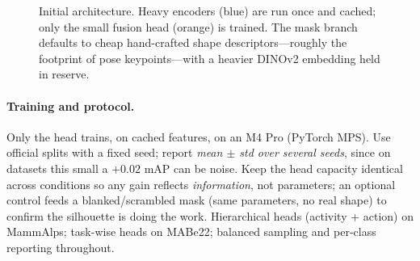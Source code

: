 \documentclass[11pt]{article}
\begin{document}
\begin{figure}[t]
\caption{Initial architecture. Heavy encoders (blue) are run once and cached; only the small fusion head (orange) is trained. The mask branch defaults to cheap hand-crafted shape descriptors---roughly the footprint of pose keypoints---with a heavier DINOv2 embedding held in reserve.}
\label{fig:arch}
\end{figure}

\paragraph{Training and protocol.} Only the head trains, on cached features, on an M4 Pro (PyTorch MPS). Use official splits with a fixed seed; report \emph{mean $\pm$ std over several seeds}, since on datasets this small a $+0.02$ mAP can be noise. Keep the head capacity identical across conditions so any gain reflects \emph{information}, not parameters; an optional control feeds a blanked/scrambled mask (same parameters, no real shape) to confirm the silhouette is doing the work. Hierarchical heads (activity + action) on MammAlps; task-wise heads on MABe22; balanced sampling and per-class reporting throughout.

\end{document}
